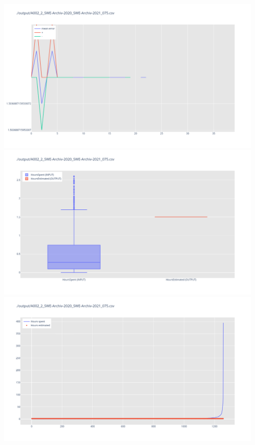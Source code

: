 \includegraphics[width=\textwidth]{Scripts/output/A002_2_SWE-Archiv-2020_SWE-Archiv-2021_075.csv.error_distribution.png}
\includegraphics[width=\textwidth]{Scripts/output/A002_2_SWE-Archiv-2020_SWE-Archiv-2021_075.csv.png}
\includegraphics[width=\textwidth]{Scripts/output/A002_2_SWE-Archiv-2020_SWE-Archiv-2021_075.csv.scatter.png}
